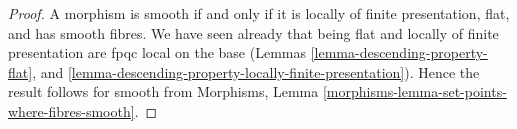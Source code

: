 \documentclass{stacks-project}
\theoremstyle{plain}
\theoremstyle{definition}
\theoremstyle{remark}
\numberwithin{equation}{subsection}
\begin{document}
\begin{proof}
A morphism is smooth if and only if it is locally of finite presentation,
flat, and has smooth fibres. We have seen
already that being flat and locally of finite presentation are
fpqc local on the base (Lemmas
\ref{lemma-descending-property-flat}, and
\ref{lemma-descending-property-locally-finite-presentation}).
Hence the result follows for smooth from
Morphisms, Lemma \ref{morphisms-lemma-set-points-where-fibres-smooth}.
\end{proof}
\end{document}
